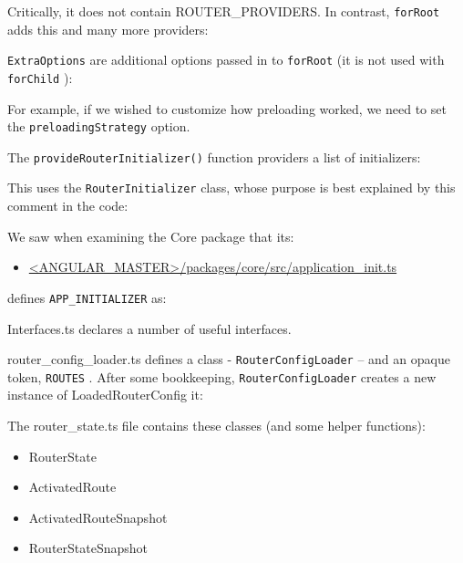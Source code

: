 

Critically, it does not contain ROUTER\_PROVIDERS. In contrast,
\texttt{forRoot}
adds this and
many more providers:



\texttt{ExtraOptions}
are additional options passed in to
\texttt{forRoot}
(it is not used with
\texttt{forChild}
):



For example, if we wished to customize how preloading worked, we need to set the
\texttt{preloadingStrategy}
option.

The
\texttt{provideRouterInitializer()}
function providers a list of initializers:



This uses the
\texttt{RouterInitializer}
class, whose purpose is best explained by this
comment in the code:



We saw when examining the Core package that its:

\begin{itemize}
  \item \href{https://github.com/angular/angular/blob/master/packages/core/src/application_init.ts}
        {<ANGULAR\_MASTER>/packages/core/src/application\_init.ts}
\end{itemize}

defines
\texttt{APP\_INITIALIZER}
as:



Interfaces.ts declares a number of useful interfaces.



router\_config\_loader.ts defines a class -
\texttt{RouterConfigLoader}
– and an opaque token,
\texttt{ROUTES}
.  After some bookkeeping,
\texttt{RouterConfigLoader}
creates a new instance of
LoadedRouterConfig it:



The router\_state.ts file contains these classes (and some helper functions):

\begin{itemize}
  \item RouterState
  \item ActivatedRoute
  \item ActivatedRouteSnapshot
  \item RouterStateSnapshot
\end{itemize}


